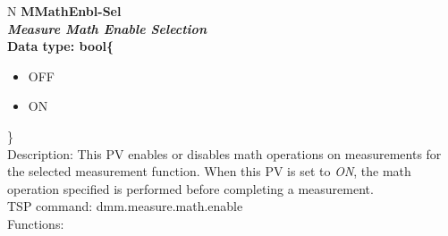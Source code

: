 \documentclass[openany]{article}
\begin{document}
		\begin{tabular}{N}
			\hline
			\bfseries MMathEnbl-Sel\label{pv:mmathenbl-sel} \\ \hline
			\emph{Measure Math Enable Selection} \\
			Data type: bool\{\begin{itemize}[noitemsep]
				\small
				\item[] OFF
				\item[] ON
			\end{itemize}\} \\
			Description: This PV enables or disables math operations on measurements for the selected measurement function. When this PV is set to \emph{ON}, the math operation specified is performed before completing a measurement. \\
			TSP command: dmm.measure.math.enable \\
			Functions: \\
			\arrayrulecolor{\FuncTableBorderColor}

		\end{tabular}
\end{document}
